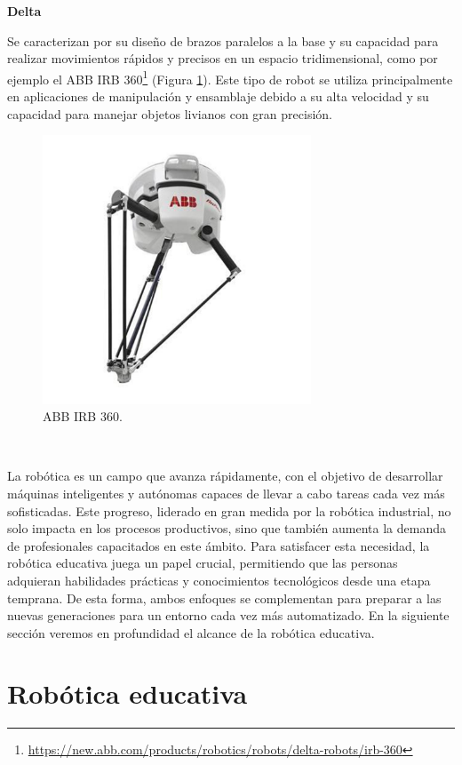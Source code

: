 \noindent\textbf{Delta} 




Se caracterizan por su diseño de brazos paralelos a la base y su capacidad para realizar movimientos rápidos y precisos en un espacio tridimensional, como por ejemplo el ABB IRB 360\footnote{\url{https://new.abb.com/products/robotics/robots/delta-robots/irb-360}} (Figura \ref{fig:delta}). Este tipo de robot se utiliza principalmente en aplicaciones de manipulación y ensamblaje debido a su alta velocidad y su capacidad para manejar objetos livianos con gran precisión. 

\begin{figure} [h!]
  \begin{center}
    \includegraphics[width=8cm]{figs/delta}
  \end{center}
  \caption{ABB IRB 360.}
  \label{fig:delta}
\end{figure}\


La robótica es un campo que avanza rápidamente, con el objetivo de desarrollar máquinas inteligentes y autónomas capaces de llevar a cabo tareas cada vez más sofisticadas. Este progreso, liderado en gran medida por la robótica industrial, no solo impacta en los procesos productivos, sino que también aumenta la demanda de profesionales capacitados en este ámbito. Para satisfacer esta necesidad, la robótica educativa juega un papel crucial, permitiendo que las personas adquieran habilidades prácticas y conocimientos tecnológicos desde una etapa temprana. De esta forma, ambos enfoques se complementan para preparar a las nuevas generaciones para un entorno cada vez más automatizado. En la siguiente sección veremos en profundidad el alcance de la robótica educativa.


\section{Robótica educativa}
\label{sec:terceraseccion}


